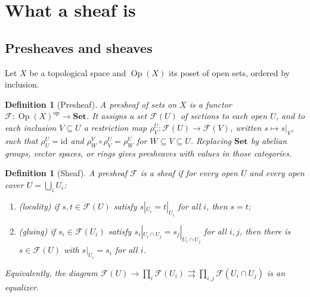 \documentclass[11pt,a4paper,oneside]{scrartcl}
\theoremstyle{guideplain}
\theoremstyle{guidedef}
\newtheorem{definition}[theorem]{Definition}
\newcommand{\F}{\mathcal{F}}
\DeclareMathOperator{\Op}{Op}
\begin{document}
\section{What a sheaf is}\label{sec:def}

\subsection{Presheaves and sheaves}

Let $X$ be a topological space and $\Op(X)$ its poset of open sets, ordered by inclusion.

\begin{definition}[Presheaf]
  A \emph{presheaf} of sets on $X$ is a functor $\F\colon \Op(X)^{\mathrm{op}}\to\mathbf{Set}$. It
  assigns a set $\F(U)$ of \emph{sections} to each open $U$, and to each inclusion $V\subseteq U$ a
  \emph{restriction map} $\rho^U_V\colon\F(U)\to\F(V)$, written $s\mapsto s|_V$, such that
  $\rho^U_U=\mathrm{id}$ and $\rho^V_W\circ\rho^U_V=\rho^U_W$ for $W\subseteq V\subseteq U$. Replacing
  $\mathbf{Set}$ by abelian groups, vector spaces, or rings gives presheaves with values in those
  categories.
\end{definition}

\begin{definition}[Sheaf]\label{def:sheaf}
  A presheaf $\F$ is a \emph{sheaf} if for every open $U$ and every open cover $U=\bigcup_i U_i$:
  \begin{enumerate}[label=(\roman*)]
    \item \emph{(locality)} if $s,t\in\F(U)$ satisfy $s|_{U_i}=t|_{U_i}$ for all $i$, then $s=t$;
    \item \emph{(gluing)} if $s_i\in\F(U_i)$ satisfy $s_i|_{U_i\cap U_j}=s_j|_{U_i\cap U_j}$ for all
          $i,j$, then there is $s\in\F(U)$ with $s|_{U_i}=s_i$ for all $i$.
  \end{enumerate}
  Equivalently, the diagram
  $\F(U)\to\prod_i\F(U_i)\rightrightarrows\prod_{i,j}\F(U_i\cap U_j)$ is an equalizer.
\end{definition}
\end{document}
